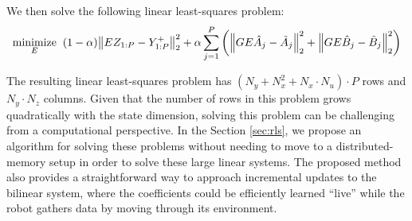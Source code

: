 \documentclass{article}
\begin{document}
We then solve the following linear least-squares problem:
\begin{align} \label{opt:jdmd}
  \underset{E}{\text{minimize}} \;\; 
    (1-\alpha) \norm{E Z_{1:P} - Y_{1:P}^+}_2^2 + 
        \alpha \sum_{j=1}^P \left( 
          \norm{G E \hat{A}_j - \tilde{A}_j}_2^2 + 
          \norm{G E \hat{B}_j - \tilde{B}_j}_2^2 \right)
\end{align}

The resulting linear least-squares problem has $(N_y + N_x^2 + N_x \cdot N_u) \cdot P$ rows
and $N_y \cdot N_z$ columns. Given that the number of rows in this problem grows
quadratically with the state dimension, solving this problem can be challenging from a
computational perspective. In the Section \ref{sec:rls}, we propose an algorithm for solving
these problems without needing to move to a distributed-memory setup in order to solve these
large linear systems. The proposed method also provides a straightforward way to approach
incremental updates to the bilinear system, where the coefficients could be efficiently
learned ``live'' while the robot gathers data by moving through its environment.



\end{document}

